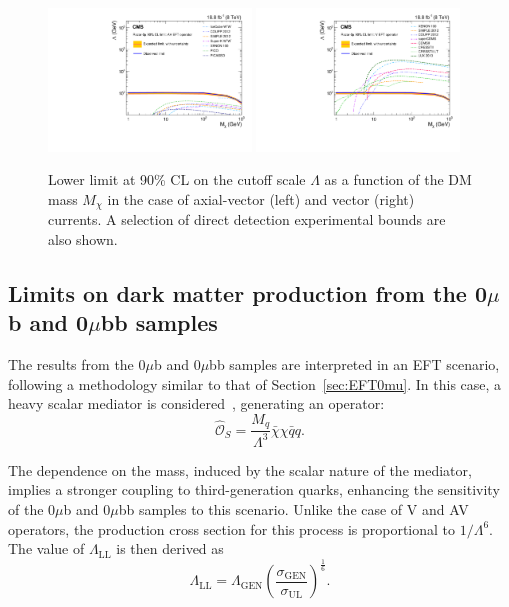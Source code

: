 \begin{figure}
\centering
\includegraphics[width=0.48\textwidth]{Limits/Final_AV_Lambda_WithDD_vFeb25_2015_FR.pdf}
\includegraphics[width=0.48\textwidth]{Limits/Final_V_Lambda_WithDD_vFeb25_2015_FR.pdf}
\caption{Lower limit at 90\% CL on the cutoff scale $\Lambda$ as a
  function of the DM mass $M_\chi$ in the case of
  axial-vector (left) and vector (right) currents. A selection of direct detection
  experimental bounds are also shown.\label{fig:LambdaComplete}}
\end{figure}
\subsection{Limits on dark matter production from the \texorpdfstring{0$\mu$b and 0$\mu$bb}{0 mu b and 0 mu bb} samples}

The results from the 0$\mu$b and 0$\mu$bb samples are interpreted in
an EFT scenario, following a methodology similar to that of
Section~\ref{sec:EFT0mu}. In this case, a heavy scalar mediator
 is considered~\cite{Lin:2013sca}, generating an operator:
\begin{equation}
\label{eq:Os}
\hat{\mathcal{O}}_{S} = \frac{M_{q}}{\Lambda^{3}}\bar{\chi}\chi \bar{q}q.
\end{equation}

The dependence on the mass, induced by the scalar nature of the
mediator, implies a stronger coupling to third-generation quarks,
enhancing the sensitivity of the 0$\mu$b and 0$\mu$bb samples to this
scenario. Unlike the case of V and AV operators, the production cross
section for this process is proportional to $1/\Lambda^{6}$. The
value of $\Lambda_\mathrm{LL}$ is then derived as
\begin{equation}
\Lambda_\mathrm{LL} = \Lambda_\text{GEN} \left(\frac{\sigma_\text{GEN}}{\sigma_\mathrm{UL}}\right)^{\frac{1}{6}}.
\end{equation}


